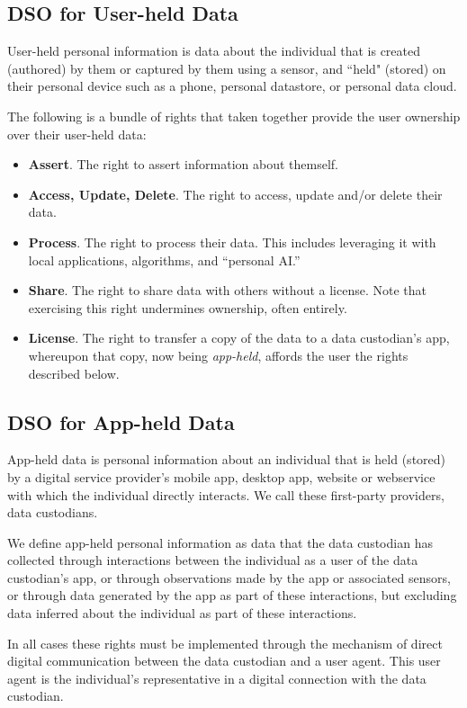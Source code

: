 \documentclass[11pt, oneside]{article}   	%
\begin{document}
\subsection{DSO for User-held Data}

User-held personal information is data about the individual that is created (authored) by them or captured by them using a sensor, and ``held"  (stored) on their personal device such as a phone, personal datastore, or personal data cloud. 

The following is a bundle of rights that taken together provide the user ownership over their user-held data:
\begin{itemize}
	\item \textbf{Assert}. The right to assert information about themself.
	\item \textbf{Access, Update, Delete}. The right to access, update and/or delete their data. 
	\item \textbf{Process}. The right to process their data. This includes leveraging it with local applications, algorithms, and ``personal AI.''  
	\item \textbf{Share}. The right to share data with others without a license. Note that exercising this right undermines ownership, often entirely.
	\item \textbf{License}. The right to transfer a copy of the data to a data custodian's app, whereupon that copy, now being \emph{app-held}, affords the user the rights described below.
\end{itemize}

\subsection{DSO for App-held Data}
App-held data is personal information about an individual that is held (stored) by a digital service provider's mobile app, desktop app, website or webservice with which the individual directly interacts. We call these first-party providers, data custodians.

We define app-held personal information as data that the data custodian has collected through interactions between the individual as a user of the data custodian's app, or through observations made by the app or associated sensors, or through data generated by the app as part of these interactions, but excluding data inferred about the individual as part of these interactions.

In all cases these rights must be implemented through the mechanism of direct digital communication between the data custodian and a user agent. This user agent is the individual's representative in a digital connection with the data custodian.
\end{document}
